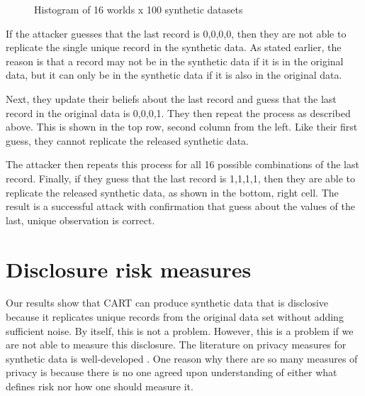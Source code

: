 \documentclass[runningheads]{llncs}
\begin{document}
\begin{figure}[!h]
    \centering
    \caption{Histogram of 16 worlds x 100 synthetic datasets}
    \label{fig:attacker_default}
\end{figure}

If the attacker guesses that the last record is 0,0,0,0, then they are not able to replicate the single unique record in the synthetic data.  As stated earlier, the reason is that a record may not be in the synthetic data if it is in the original data, but it can only be in the synthetic data if it is also in the original data. 

Next, they update their beliefs about the last record and guess that the last record in the original data is 0,0,0,1.  They then repeat the process as described above.  This is shown in the top row, second column from the left.  Like their first guess, they cannot replicate the released synthetic data.  

The attacker then repeats this process for all 16 possible combinations of the last record.  Finally, if they guess that the last record is 1,1,1,1, then they are able to replicate the released synthetic data, as shown in the bottom, right cell.  The result is a successful attack with confirmation that guess about the values of the last, unique observation is correct.

\section{Disclosure risk measures}

Our results show that CART can produce synthetic data that is disclosive because it replicates unique records from the original data set without adding sufficient noise.  By itself, this is not a problem.  However, this is a problem if we are not able to measure this disclosure.  The literature on privacy measures for synthetic data is well-developed \cite{wagner2018technical}.  One reason why there are so many measures of privacy is because there is no one agreed upon understanding of either what defines risk nor how one should measure it.  
\end{document}
